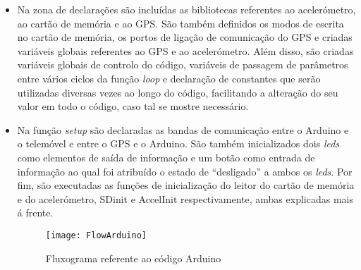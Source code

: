 \begin{itemize}
\item Na zona de declarações são incluídas as bibliotecas referentes ao acelerómetro, ao cartão de memória e ao GPS.
São também definidos os modos de escrita no cartão de memória, os portos de ligação de comunicação do GPS e criadas variáveis globais referentes ao GPS e ao acelerómetro.
Além disso, são criadas variáveis globais de controlo do código, variáveis de passagem de parâmetros entre vários ciclos da função \emph{loop} e declaração de constantes que serão utilizadas diversas vezes ao longo do código, facilitando a alteração do seu valor em todo o código, caso tal se mostre necessário.

\item Na função \emph{setup} são declaradas as bandas de comunicação entre o Arduino e o telemóvel e entre o GPS e o Arduino.
São também inicializados dois \emph{leds} como elementos de saída de informação e um botão como entrada de informação ao qual foi atribuído o estado de “desligado” a ambos os \emph{leds}.
Por fim, são executadas as funções de inicialização do leitor do cartão de memória e do acelerómetro, SD\textunderscore init e AccelInit respectivamente, ambas explicadas mais á frente.

\begin{figure}[hbtp]
	\centering
	\texttt{[image: FlowArduino]}
	\caption{Fluxograma referente ao código Arduino}
	\label{fig:Fluxograma_referente_ao_código_arduino}
\end{figure}


\end{itemize}
